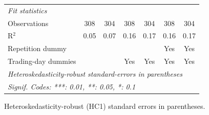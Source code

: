 \begin{tabular}{lcccccc}
   \midrule
   \emph{Fit statistics}\\
   Observations           & 308            & 304            & 308            & 304            & 308            & 304\\  
   R$^2$                  & 0.05           & 0.07           & 0.16           & 0.17           & 0.16           & 0.17\\  
   Repetition dummy       &                &                &                &                & Yes            & Yes\\  
   Trading-day dummies    &                &                & Yes            & Yes            & Yes            & Yes\\  
   \midrule \midrule
   \multicolumn{7}{l}{\emph{Heteroskedasticity-robust standard-errors in parentheses}}\\
   \multicolumn{7}{l}{\emph{Signif. Codes: ***: 0.01, **: 0.05, *: 0.1}}\\
\end{tabular}
 
\par \raggedright 
Heteroskedasticity-robust (HC1) standard errors in parentheses.
\par\endgroup
